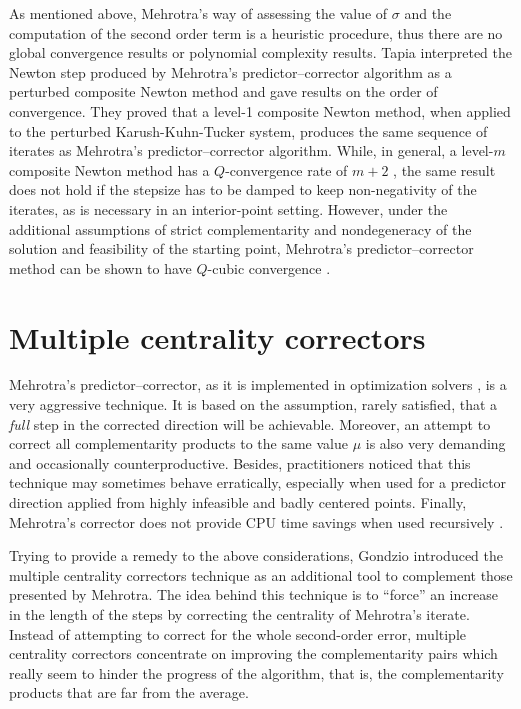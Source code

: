 As mentioned above, Mehrotra's way of assessing the value of $\sigma$
and the computation of the second order term is a heuristic procedure,
thus there are 
no global convergence results or polynomial complexity results. 
Tapia \etal \cite{TapiaZhangSaltzmanWeiser} interpreted the Newton step 
produced by Mehrotra's predictor--corrector algorithm as a perturbed
composite Newton method and gave results on the order of convergence. 
They proved that a level-1 composite Newton method, when applied 
to the perturbed Karush-Kuhn-Tucker system, produces the same 
sequence of iterates as Mehrotra's predictor--corrector algorithm. 
While, in general, a level-$m$ composite Newton method has 
a $Q$-convergence rate of $m+2$ \cite{OrtegaRheinboldt},
the same result does not hold 
if the stepsize has to be damped to keep non-negativity of the iterates, 
as is necessary in an interior-point setting. However, under 
the additional assumptions of strict complementarity and nondegeneracy 
of the solution and feasibility of the starting point, Mehrotra's 
predictor--corrector method can be shown to have $Q$-cubic convergence
\cite{TapiaZhangSaltzmanWeiser}.


%
%
\section{Multiple centrality correctors}
\label{sec:MultipleCC}

Mehrotra's predictor--corrector, as it is implemented in optimization 
solvers \cite{LustigMarstenShanno,Mehrotra92}, is a very aggressive 
technique. It is based on the assumption, rarely satisfied, that a 
{\it full} step in the corrected direction will be achievable.
Moreover, an attempt to correct all complementarity products to the 
same value $\mu$ is also very demanding and occasionally
counterproductive. 
Besides, practitioners noticed that this technique may sometimes 
behave erratically, especially when used for a predictor direction 
applied from highly infeasible and badly centered points. 
Finally, Mehrotra's corrector does not provide CPU time savings 
when used recursively \cite{CarpenterLustigMulveyShanno}.

Trying to provide a remedy to the above considerations, Gondzio 
\cite{Gondzio96} introduced the multiple centrality correctors technique 
as an additional tool to complement those presented by Mehrotra. 
The idea behind this technique is to ``force'' an increase in the 
length of the steps by correcting the centrality of Mehrotra's 
iterate.
Instead of attempting to correct for the whole second-order error,
multiple centrality correctors 
concentrate on improving the complementarity pairs which really seem 
to hinder the progress of the algorithm, that is, the complementarity products 
that are far from the average.

